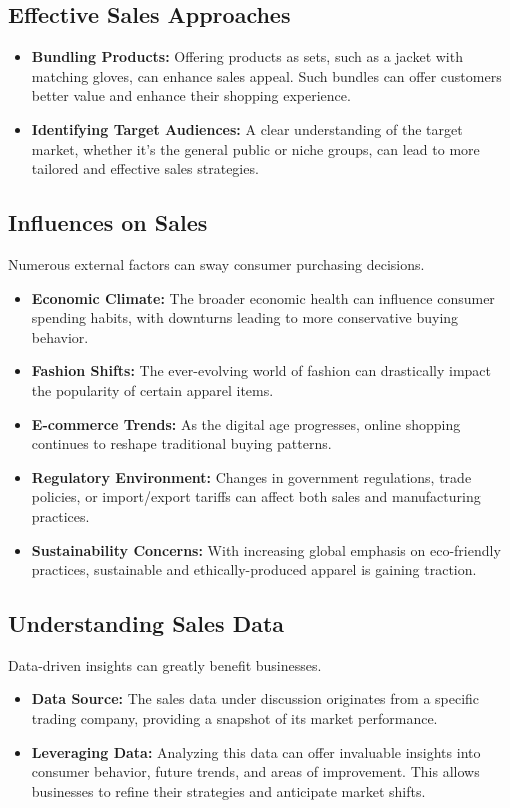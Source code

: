 \documentclass{article}
\begin{document}
\subsection{Effective Sales Approaches}
\begin{itemize}
    \item \textbf{Bundling Products:} Offering products as sets, such as a jacket with matching gloves, can enhance sales appeal. Such bundles can offer customers better value and enhance their shopping experience.
    \item \textbf{Identifying Target Audiences:} A clear understanding of the target market, whether it's the general public or niche groups, can lead to more tailored and effective sales strategies.
\end{itemize}

\subsection{Influences on Sales}
Numerous external factors can sway consumer purchasing decisions.
\begin{itemize}
    \item \textbf{Economic Climate:} The broader economic health can influence consumer spending habits, with downturns leading to more conservative buying behavior.
    \item \textbf{Fashion Shifts:} The ever-evolving world of fashion can drastically impact the popularity of certain apparel items.
    \item \textbf{E-commerce Trends:} As the digital age progresses, online shopping continues to reshape traditional buying patterns.
    \item \textbf{Regulatory Environment:} Changes in government regulations, trade policies, or import/export tariffs can affect both sales and manufacturing practices.
    \item \textbf{Sustainability Concerns:} With increasing global emphasis on eco-friendly practices, sustainable and ethically-produced apparel is gaining traction.
\end{itemize}

\subsection{Understanding Sales Data}
Data-driven insights can greatly benefit businesses.
\begin{itemize}
    \item \textbf{Data Source:} The sales data under discussion originates from a specific trading company, providing a snapshot of its market performance.
    \item \textbf{Leveraging Data:} Analyzing this data can offer invaluable insights into consumer behavior, future trends, and areas of improvement. This allows businesses to refine their strategies and anticipate market shifts.
\end{itemize}
\end{document}
